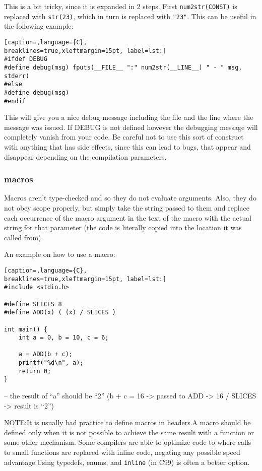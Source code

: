 This is a bit tricky, since it is expanded in 2 steps. First
\texttt{num2str(CONST)} is replaced with \texttt{str(23)}, which in turn is
replaced with \texttt{"23"}. This can be useful in the following example:
\lstset{basicstyle=\scriptsize, numbers=left, captionpos=b, tabsize=4}
\begin{lstlisting}[caption=,language={C},
breaklines=true,xleftmargin=15pt, label=lst:]
#ifdef DEBUG
#define debug(msg) fputs(__FILE__ ":" num2str(__LINE__) " - " msg, stderr)
#else
#define debug(msg)
#endif
\end{lstlisting}

This will give you a nice debug message including the file and the line where
the message was issued. If DEBUG is not defined however the debugging message
will completely vanish from your code. Be careful not to use this sort of
construct with anything that has side effects, since this can lead to bugs,
that appear and disappear depending on the compilation parameters.

\subsubsection{macros}
Macros aren't type-checked and so they do not evaluate arguments. Also, they do
not obey scope properly, but simply take the string passed to them and replace
each occurrence of the macro argument in the text of the macro with the actual
string for that parameter (the code is literally copied into the location it
was called from).

An example on how to use a macro:
\lstset{basicstyle=\scriptsize, numbers=left, captionpos=b, tabsize=4}
\begin{lstlisting}[caption=,language={C},
breaklines=true,xleftmargin=15pt, label=lst:]
#include <stdio.h>

#define SLICES 8
#define ADD(x) ( (x) / SLICES )

int main() {
	int a = 0, b = 10, c = 6;
	
	a = ADD(b + c);
	printf("%d\n", a);
	return 0;
}
\end{lstlisting}

-- the result of ``a'' should be ``2'' (b + c = 16 -\textgreater{} passed to
ADD -\textgreater{} 16 / SLICES -\textgreater{} result is ``2'')

NOTE:It is usually bad practice to define macros in headers.A macro should
be defined only when it is not possible to achieve the same result with a
function or some other mechanism. Some compilers are able to optimize code to
where calls to small functions are replaced with inline code, negating any
possible speed advantage.Using typedefs, enums, and \texttt{inline} (in C99) is
often a better option.

